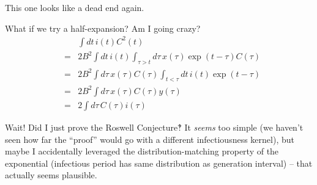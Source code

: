 \documentclass[12pt]{article}
\begin{document}
This one looks like a dead end again.

What if we try a half-expansion? Am I going crazy? 
\begin{eqnarray}
	&& \int{dt\, i(t) C^2(t)}
	\\ &=& 2B^2 \int{dt\, i(t) \int_{\tau>t}{d\tau\, x(\tau) \exp(t-\tau) C(\tau)}}
	\\ &=& 2B^2 \int{d\tau\, x(\tau) C(\tau) \int_{t<\tau}{dt\, i(t) \exp(t-\tau)}}
	\\ &=& 2B^2 \int{d\tau\, x(\tau) C(\tau) y(\tau)}
	\\ &=& 2 \int{d\tau\, C(\tau) i(\tau)}
\end{eqnarray}

Wait! Did I just prove the Roswell Conjecture‽ It \emph{seems} too simple (we haven't seen how far the “proof” would go with a different infectiousness kernel), but maybe I accidentally leveraged the distribution-matching property of the exponential (infectious period has same distribution as generation interval) – that actually seems plausible.
\end{document}
